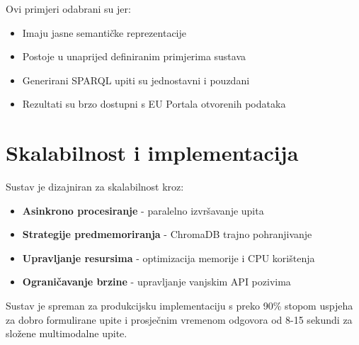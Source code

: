 Ovi primjeri odabrani su jer:
\begin{itemize}
    \item Imaju jasne semantičke reprezentacije
    \item Postoje u unaprijed definiranim primjerima sustava
    \item Generirani SPARQL upiti su jednostavni i pouzdani
    \item Rezultati su brzo dostupni s EU Portala otvorenih podataka
\end{itemize}

\section{Skalabilnost i implementacija}
\label{sec:scalability}

Sustav je dizajniran za skalabilnost kroz:
\begin{itemize}
    \item \textbf{Asinkrono procesiranje} - paralelno izvršavanje upita
    \item \textbf{Strategije predmemoriranja} - ChromaDB trajno pohranjivanje
    \item \textbf{Upravljanje resursima} - optimizacija memorije i CPU korištenja
    \item \textbf{Ograničavanje brzine} - upravljanje vanjskim API pozivima
\end{itemize}

Sustav je spreman za produkcijsku implementaciju s preko 90\% stopom uspjeha za dobro formulirane upite i prosječnim vremenom odgovora od 8-15 sekundi za složene multimodalne upite. 